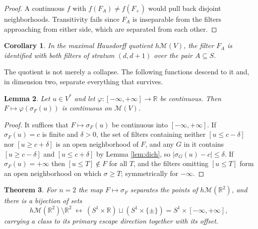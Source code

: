 \documentclass[11pt]{amsart}
\theoremstyle{plain}
\newtheorem{theorem}{Theorem}[section]
\newtheorem{lemma}[theorem]{Lemma}
\newtheorem{corollary}[theorem]{Corollary}
\theoremstyle{definition}
\newcommand{\RR}{\mathbb{R}}
\newcommand{\Vs}{V^{*}}
\begin{document}
\begin{proof}
A continuous $f$ with $f(F_A)\neq f(F_{+})$ would pull back disjoint neighborhoods. Transitivity fails since $F_A$ is inseparable from the filters approaching from either side, which are separated from each other.
\end{proof}

\begin{corollary}\label{cor:collapse}
In the maximal Hausdorff quotient $h\mathcal{M}(V)$, the filter $F_A$ is identified with both filters of stratum $(d,d+1)$ over the pair $A\subseteq S$.
\end{corollary}

The quotient is not merely a collapse. The following functions descend to it and, in dimension two, separate everything that survives.

\begin{lemma}\label{lem:phifunctions}
Let $u\in\Vs$ and let $\varphi:[-\infty,+\infty]\to\RR$ be continuous. Then $F\mapsto\varphi(\sigma_F(u))$ is continuous on $\mathcal{M}(V)$.
\end{lemma}

\begin{proof}
It suffices that $F\mapsto\sigma_F(u)$ be continuous into $[-\infty,+\infty]$. If $\sigma_F(u)=c$ is finite and $\delta>0$, the set of filters containing neither $[u\le c-\delta]$ nor $[u\ge c+\delta]$ is an open neighborhood of $F$, and any $G$ in it contains $[u\ge c-\delta]$ and $[u\le c+\delta]$ by Lemma \ref{lem:dich}, so $|\sigma_G(u)-c|\le\delta$. If $\sigma_F(u)=+\infty$ then $[u\le T]\notin F$ for all $T$, and the filters omitting $[u\le T]$ form an open neighborhood on which $\sigma\ge T$; symmetrically for $-\infty$.
\end{proof}

\begin{theorem}\label{thm:hM2}
For $n=2$ the map $F\mapsto\sigma_F$ separates the points of $h\mathcal{M}(\RR^2)$, and there is a bijection of sets
\[
h\mathcal{M}(\RR^2)\setminus\RR^2\ \longleftrightarrow\ (S^1\times\RR)\sqcup(S^1\times\{\pm\})=S^1\times[-\infty,+\infty],
\]
carrying a class to its primary escape direction together with its offset.
\end{theorem}
\end{document}
